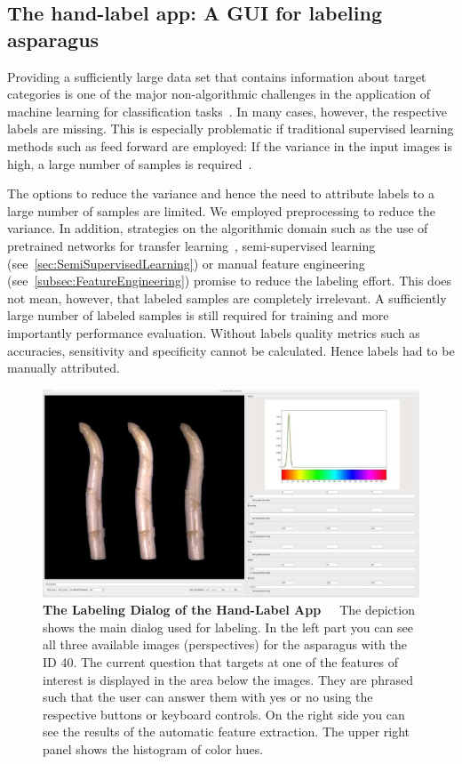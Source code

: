 \subsection{The hand-label app: A GUI for labeling asparagus}
\label{sec:LabelApp}

Providing a sufficiently large data set that contains information about target categories is one of the major non-algorithmic challenges in the application of machine learning for classification tasks~\citep{al2018labeling}. In many cases, however, the respective labels are missing. This is especially problematic if traditional supervised learning methods such as feed forward  are employed: If the variance in the input images is high, a large number of samples is required~\citep{russakovsky2015imagenet}. 

The options to reduce the variance and hence the need to attribute labels to a large number of samples are limited. We employed preprocessing to reduce the variance. In addition, strategies on the algorithmic domain such as the use of pretrained networks for transfer learning~\citep{gupta2018keras}, semi-supervised learning (see~\autoref{sec:SemiSupervisedLearning}) or manual feature engineering (see~\autoref{subsec:FeatureEngineering}) promise to reduce the labeling effort. This does not mean, however, that labeled samples are completely irrelevant. A sufficiently large number of labeled samples is still required for training and more importantly performance evaluation. Without labels quality metrics such as accuracies, sensitivity and specificity cannot be calculated. Hence labels had to be manually attributed.

\begin{figure}[h]
	\centering
	\includegraphics[scale=0.3]{Figures/chapter03/labelapp_example.png}
	\decoRule
	\caption[The Labeling Dialog of the Hand-Label App]{\textbf{The Labeling Dialog of the Hand-Label App}~~~The depiction shows the main dialog used for labeling. In the left part you can see all three available images (perspectives) for the asparagus with the ID 40. The current question that targets at one of the features of interest is displayed in the area below the images. They are phrased such that the user can answer them with yes or no using the respective buttons or keyboard controls. On the right side you can see the results of the automatic feature extraction. The upper right panel shows the histogram of color hues.}
	\label{fig:LabelAppGUI}
\end{figure}

